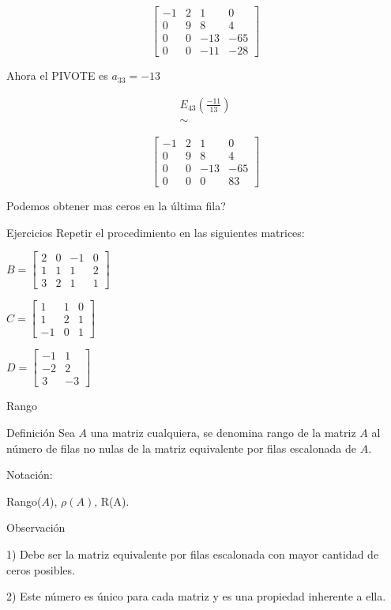 $$\begin{bmatrix}
-1 &  2  & 1  &  0\\
0  &  9  & 8  &  4\\
0  &  0 & -13  &  -65\\
0  &  0 & -11  &  -28
\end{bmatrix}
$$


Ahora el PIVOTE es $a_{33}=-13$

$$\begin{array}{c}
 E_{43}(\frac{-11}{13})\\
\sim
\end{array}$$

$$\begin{bmatrix}
-1 &  2  & 1  &  0\\
0  &  9  & 8  &  4\\
0  &  0 & -13  &  -65\\
0  &  0 &  0  &  83
\end{bmatrix}
$$


Podemos obtener mas ceros en la última fila?


{Ejercicios}
Repetir el procedimiento en las siguientes matrices:


$B=
\begin{bmatrix}
2 & 0    & -1  &  0\\
1  &  1  & 1   &  2\\
3  &   2 & 1   &  1
\end{bmatrix}
$

$C=
\begin{bmatrix}
1   & 1    &  0\\
1   &  2   &  1\\
 -1 &   0  & 1
\end{bmatrix}
$

$D=
\begin{bmatrix}
 -1  &  1\\
-2  &  2\\
3   & -3 
\end{bmatrix}
$


{Rango}

\begin{block}{Definición}
Sea $A$ una matriz cualquiera, se denomina rango de la matriz $A$ al número de filas no nulas de la matriz equivalente por filas escalonada de $A$.

Notación:

Rango($A$), $\rho(A)$, R(A).
\end{block}

\begin{block}{Observación}

1) Debe ser la matriz equivalente por filas escalonada con mayor cantidad de ceros posibles.

2) Este número es único para cada matriz y es una propiedad inherente a ella.

\end{block}



